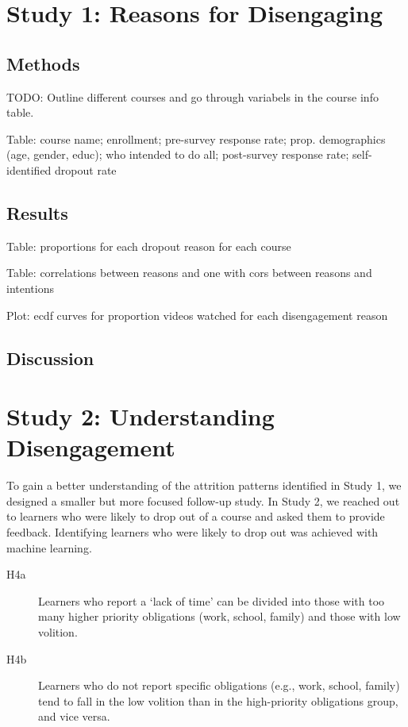 \documentclass{sigchi}\usepackage[]{graphicx}\usepackage[]{color}
\begin{document}
\section{Study 1: Reasons for Disengaging}



\subsection{Methods}

TODO: Outline different courses and go through variabels in the course info table.

Table:  course name; enrollment; pre-survey response rate; prop. demographics (age, gender, educ); who intended to do all; post-survey response rate; self-identified dropout rate


\subsection{Results}

Table: proportions for each dropout reason for each course

Table: correlations between reasons and one with cors between reasons and intentions

Plot: ecdf curves for proportion videos watched for each disengagement reason


\subsection{Discussion}


\section{Study 2: Understanding Disengagement}

To gain a better understanding of the attrition patterns identified in Study 1, we designed a smaller but more focused follow-up study. In Study 2, we reached out to learners who were likely to drop out of a course and asked them to provide feedback. Identifying learners who were likely to drop out was achieved with machine learning.

\begin{description}
  \item[H4a] Learners who report a `lack of time' can be divided into those with too many higher priority obligations (work, school, family) and those with low volition.
  \item[H4b] Learners who do not report specific obligations (e.g., work, school, family) tend to fall in the low volition than in the high-priority obligations group, and vice versa.
\end{description}  
\end{document}
